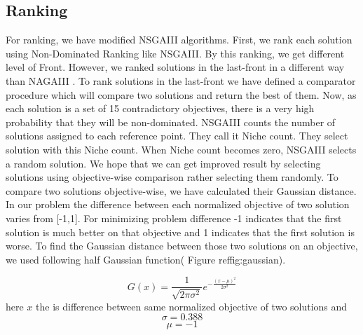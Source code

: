 \documentclass[letterpaper, 10 pt, conference]{ieeeconf}  %
\begin{document}
\subsection{Ranking}
For ranking, we have modified NSGAIII algorithms. First, we rank each solution using Non-Dominated Ranking like NSGAIII. By this ranking, we get different level of Front. However, we ranked solutions in  the last-front in a different way than NAGAIII . To rank solutions in  the last-front we have defined a comparator procedure which will compare two solutions and return the best of them. Now, as each solution is a set of 15 contradictory objectives, there is a very high probability that they will be non-dominated. NSGAIII counts the number of solutions assigned to each reference point. They call it Niche count. They select solution with this Niche count. When Niche count becomes zero, NSGAIII selects a random solution. We hope that we can get improved result by selecting solutions using objective-wise comparison rather selecting them randomly. To compare two solutions objective-wise, we have calculated their Gaussian distance. In our problem the difference between each normalized objective of two solution varies from [-1,1].
For minimizing problem difference -1 indicates that  the first solution is much better on that objective and 1 indicates that the first solution is worse. 
To find the Gaussian distance between those two solutions on an objective, we used following half Gaussian function( Figure ref{fig:gaussian}).

\begin{equation}
G(x)=\frac{1}{\sqrt{2\pi\sigma^2}} e^{-\frac{(x-\mu)^2}{2\sigma^2}}
\end{equation}
here $x$  the is difference between same normalized objective of two solutions and
\begin{equation}
\sigma=0.388
\end{equation}
\begin{equation}
\mu=-1
\end{equation}
\end{document}
